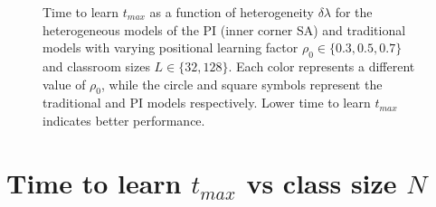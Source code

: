 \begin{figure}[htbp!]
   \centering
   \caption[Heterogeneity $\delta\lambda$ dependence of time to learn $t_{max}$ for the heterogeneous classroom model]{Time to learn $t_{max}$ as a function of heterogeneity $\delta\lambda$ for the heterogeneous models of the PI (inner corner SA) and traditional models with varying positional learning factor $\rho_0\in\lbrace 0.3,0.5,0.7 \rbrace$ and classroom sizes $L\in\lbrace32,128\rbrace$. 
   Each color represents a different value of $\rho_0$, while the circle and square symbols represent the traditional and PI models respectively.
   Lower time to learn $t_{max}$ indicates better performance.
   }
   \label{fig:2DBPCAIH dl-t plots}
\end{figure}

\newpage %

\section{Time to learn $t_{max}$ vs class size $N$}\label{sec:BPCAIH m vs dl}

